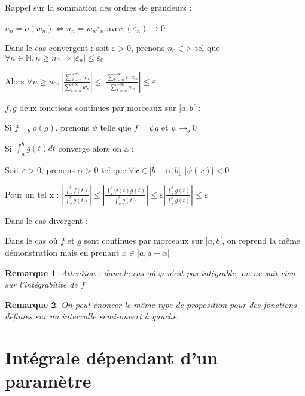 \documentclass[a4paper,12pt]{book}
\newcommand{\Pre}[1]{\begin{tcolorbox}[sharp corners, colback=white,colframe=green!60!green!30!black!75, title=Preuve]#1\end{tcolorbox}}
\newtheorem{Rem}{Remarque}[section]
\def\N{\mathbb{N}}
\begin{document}
\Pre{Rappel sur la sommation des ordres de grandeurs : \par $u_n = o(w_n) \Leftrightarrow u_n = w_n\varepsilon_n$ avec $(\varepsilon_n)\to 0$ \par Dans le cas convergent : soit $\varepsilon>0$, prenons $n_0\in\N$ tel que $\forall n\in\N, n\geq n_0 \Rightarrow \vert\varepsilon_n\vert\leq \varepsilon_0$ \par Alors $\forall n\geq n_0, \left\vert\frac{\sum\limits_{k=n}^{+\infty}u_n}{\sum\limits_{k=n}^{+\infty}w_n}\right\vert \leq \left\vert\frac{\sum\limits_{k=n}^{+\infty}\varepsilon_nw_n}{\sum\limits_{k=n}^{+\infty}w_n}\right\vert\leq \varepsilon$
\par $f,g$ deux fonctions continues par morceaux sur $[a,b[$ : \par Si $f=_bo(g)$, prenons $\psi$ telle que $f=\psi g$ et $\psi\to_b 0$ \par Si $\int_a^bg(t)dt$ converge alors on a : \par Soit $\varepsilon>0$, prenons $\alpha>0$ tel que $\forall x\in ]b-\alpha,b[, \vert\psi(x)\vert<0$ \par Pour un tel x : $\left\vert\frac{\int_x^bf(t)}{\int_x^bg(t)}\right\vert\leq \left\vert\frac{\int_x^b\psi(t)g(t)}{\int_x^bg(t)}\right\vert\leq \varepsilon\left\vert\frac{\int_x^bg(t)}{\int_x^bg(t)}\right\vert\leq \varepsilon$ 
\par Dans le cas divergent :
\par Dans le cas où $f$ et $g$ sont continues par morceaux sur $]a,b[$, on reprend la même démonstration mais en prenant $x\in ]a, a+\alpha[$}
\begin{Rem}
Attention : dans le cas où $\varphi$ n'est pas intégrable, on ne sait rien sur l'intégrabilité de $f$ 
\end{Rem}
\begin{Rem}
On peut énoncer le même type de proposition pour des fonctions définies sur un intervalle semi-ouvert à gauche.
\end{Rem}

\section{Intégrale dépendant d'un paramètre}
\end{document}
